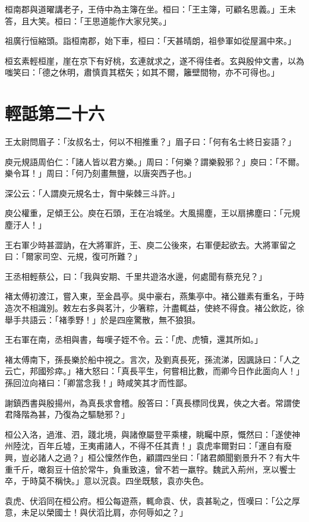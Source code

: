 桓南郡與道曜講老子，王侍中為主簿在坐。桓曰：「王主簿，可顧名思義。」王未答，且大笑。桓曰：「王思道能作大家兒笑。」

祖廣行恒縮頭。詣桓南郡，始下車，桓曰：「天甚晴朗，祖參軍如從屋漏中來。」

桓玄素輕桓崖，崖在京下有好桃，玄連就求之，遂不得佳者。玄與殷仲文書，以為嗤笑曰：「德之休明，肅慎貢其楛矢；如其不爾，籬壁間物，亦不可得也。」



\chapter{輕詆第二十六}

王太尉問眉子：「汝叔名士，何以不相推重？」眉子曰：「何有名士終日妄語？」

庾元規語周伯仁：「諸人皆以君方樂。」周曰：「何樂？謂樂毅邪？」庾曰：「不爾。樂令耳！」周曰：「何乃刻畫無鹽，以唐突西子也。」

深公云：「人謂庾元規名士，胷中柴棘三斗許。」

庾公權重，足傾王公。庾在石頭，王在冶城坐。大風揚塵，王以扇拂塵曰：「元規塵汙人！」

王右軍少時甚澀訥，在大將軍許，王、庾二公後來，右軍便起欲去。大將軍留之曰：「爾家司空、元規，復可所難？」

王丞相輕蔡公，曰：「我與安期、千里共遊洛水邊，何處聞有蔡充兒？」

褚太傅初渡江，嘗入東，至金昌亭。吳中豪右，燕集亭中。褚公雖素有重名，于時造次不相識別。敕左右多與茗汁，少箸粽，汁盡輒益，使終不得食。褚公飲訖，徐舉手共語云：「褚季野！」於是四座驚散，無不狼狽。

王右軍在南，丞相與書，每嘆子姪不令。云：「虎、虎犢，還其所如。」

褚太傅南下，孫長樂於船中視之。言次，及劉真長死，孫流涕，因諷詠曰：「人之云亡，邦國殄瘁。」褚大怒曰：「真長平生，何嘗相比數，而卿今日作此面向人！」孫回泣向褚曰：「卿當念我！」時咸笑其才而性鄙。

謝鎮西書與殷揚州，為真長求會稽。殷答曰：「真長標同伐異，俠之大者。常謂使君降階為甚，乃復為之驅馳邪？」

桓公入洛，過淮、泗，踐北境，與諸僚屬登平乘樓，眺矚中原，慨然曰：「遂使神州陸沈，百年丘墟，王夷甫諸人，不得不任其責！」袁虎率爾對曰：「運自有廢興，豈必諸人之過？」桓公懍然作色，顧謂四坐曰：「諸君頗聞劉景升不？有大牛重千斤，噉芻豆十倍於常牛，負重致遠，曾不若一羸牸。魏武入荊州，烹以饗士卒，于時莫不稱快。」意以況袁。四坐既駭，袁亦失色。

袁虎、伏滔同在桓公府。桓公每遊燕，輒命袁、伏，袁甚恥之，恆嘆曰：「公之厚意，未足以榮國士！與伏滔比肩，亦何辱如之？」

